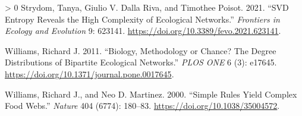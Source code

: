 \documentclass[10pt,oneside]{article}
\newlength{\cslhangindent}
\newenvironment{CSLReferences}[3] %
 {%
  \setlength{\parindent}{0pt}
  \ifodd #1 \everypar{\setlength{\hangindent}{\cslhangindent}}\ignorespaces\fi
  \ifnum #2 > 0
  \setlength{\parskip}{#2\baselineskip}
  \fi
 }%
 {}
\begin{document}
\begin{CSLReferences}{1}{0}
\leavevmode\hypertarget{ref-Strydom2021SvdEnt}{}%
Strydom, Tanya, Giulio V. Dalla Riva, and Timothee Poisot. 2021. {``SVD
Entropy Reveals the High Complexity of Ecological Networks.''}
\emph{Frontiers in Ecology and Evolution} 9: 623141.
\url{https://doi.org/10.3389/fevo.2021.623141}.

\leavevmode\hypertarget{ref-Williams2011BioMet}{}%
Williams, Richard J. 2011. {``Biology, Methodology or Chance? The Degree
Distributions of Bipartite Ecological Networks.''} \emph{PLOS ONE} 6
(3): e17645. \url{https://doi.org/10.1371/journal.pone.0017645}.

\leavevmode\hypertarget{ref-Williams2000SimRul}{}%
Williams, Richard J., and Neo D. Martinez. 2000. {``Simple Rules Yield
Complex Food Webs.''} \emph{Nature} 404 (6774): 180--83.
\url{https://doi.org/10.1038/35004572}.

\end{CSLReferences}
\end{document}
